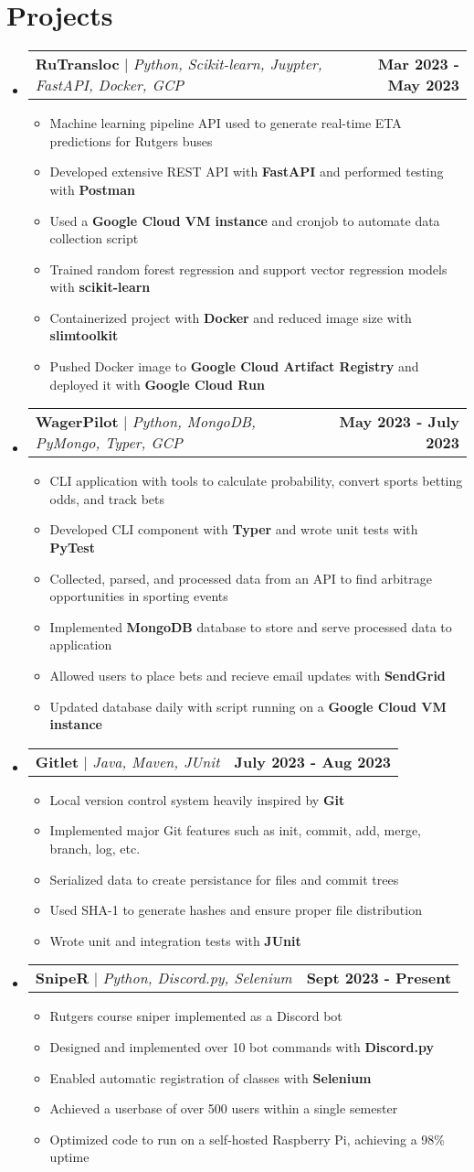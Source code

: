 \documentclass[letterpaper,11pt]{article}
\makeatletter
\newcommand{\resumeItem}[1]{
  \item\small{
    {#1 \vspace{-2pt}}
  }
}
\newcommand{\resumeProjectHeading}[2]{
    \item
    \begin{tabular*}{0.97\textwidth}{l@{\extracolsep{\fill}}r}
      \small#1 & #2 \\
    \end{tabular*}\vspace{-7pt}
}
\newcommand{\resumeSubHeadingListStart}{\begin{itemize}[leftmargin=0.15in, label={}]}
\newcommand{\resumeSubHeadingListEnd}{\end{itemize}}
\newcommand{\resumeItemListStart}{\begin{itemize}}
\newcommand{\resumeItemListEnd}{\end{itemize}\vspace{-3pt}}
\makeatother
\begin{document}
\section{Projects}
    \resumeSubHeadingListStart
      \resumeProjectHeading
          {\textbf{RuTransloc} $|$ \emph{Python, Scikit-learn, Juypter, FastAPI, Docker, GCP}}{\textbf{Mar 2023 - May 2023}}
          \resumeItemListStart
            \resumeItem{Machine learning pipeline API used to generate real-time ETA predictions for Rutgers buses}
            \resumeItem{Developed extensive REST API with \textbf{FastAPI} and performed testing with \textbf{Postman}}
            \resumeItem{Used a \textbf{Google Cloud VM instance} and cronjob to automate data collection script}
            \resumeItem{Trained random forest regression and support vector regression models with \textbf{scikit-learn}}
            \resumeItem{Containerized project with \textbf{Docker} and reduced image size with \textbf{slimtoolkit}}
            \resumeItem{Pushed Docker image to \textbf{Google Cloud Artifact Registry} and deployed it with \textbf{Google Cloud Run}}
          \resumeItemListEnd
      \resumeProjectHeading
          {\textbf{WagerPilot} $|$ \emph{Python, MongoDB, PyMongo, Typer, GCP}}{\textbf{May 2023 - July 2023}}
          \resumeItemListStart
            \resumeItem{CLI application with tools to calculate probability, convert sports betting odds, and track bets}
            \resumeItem{Developed CLI component with \textbf{Typer} and wrote unit tests with \textbf{PyTest}}
            \resumeItem{Collected, parsed, and processed data from an API to find arbitrage opportunities in sporting events}
            \resumeItem{Implemented \textbf{MongoDB} database to store and serve processed data to application}
            \resumeItem{Allowed users to place bets and recieve email updates with \textbf{SendGrid}}
            \resumeItem{Updated database daily with script running on a \textbf{Google Cloud VM instance}}
          \resumeItemListEnd
      \resumeProjectHeading
          {\textbf{Gitlet} $|$ \emph{Java, Maven, JUnit}}{\textbf{July 2023 - Aug 2023}}
          \resumeItemListStart
            \resumeItem{Local version control system heavily inspired by \textbf{Git}}
            \resumeItem{Implemented major Git features such as init, commit, add, merge, branch, log, etc.}
            \resumeItem{Serialized data to create persistance for files and commit trees}
            \resumeItem{Used SHA-1 to generate hashes and ensure proper file distribution}
            \resumeItem{Wrote unit and integration tests with \textbf{JUnit}}
          \resumeItemListEnd
      \resumeProjectHeading
          {\textbf{SnipeR} $|$ \emph{Python, Discord.py, Selenium}}{\textbf{Sept 2023 - Present}}
          \resumeItemListStart
            \resumeItem{Rutgers course sniper implemented as a Discord bot}
            \resumeItem{Designed and implemented over 10 bot commands with \textbf{Discord.py}}
            \resumeItem{Enabled automatic registration of classes with \textbf{Selenium}}
            \resumeItem{Achieved a userbase of over 500 users within a single semester}
            \resumeItem{Optimized code to run on a self-hosted Raspberry Pi, achieving a 98\% uptime}
          \resumeItemListEnd
    \resumeSubHeadingListEnd
  

\end{document}
